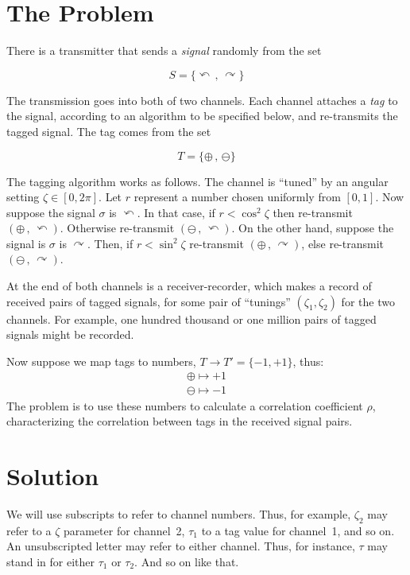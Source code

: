 \documentclass[9pt,technote]{IEEEtran}
\begin{document}
\section{The Problem}

There is a transmitter that sends a {\em{signal}} randomly from the
set

\begin{equation}
  S=\{\curvearrowleft\,,\,\curvearrowright\}
\end{equation}

The transmission goes into both of two channels. Each channel attaches
a {\em{tag}} to the signal, according to an algorithm to be specified
below, and re-transmits the tagged signal. The tag comes from the set

\begin{equation}
  T=\{\oplus\,,\,\ominus\}
\end{equation}

The tagging algorithm works as follows. The channel is ``tuned'' by an
angular setting $\zeta\in[0,2\pi]$. Let $r$ represent a number chosen
uniformly from $[0,1]$. Now suppose the signal $\sigma$ is
$\curvearrowleft$. In that case, if $r < \cos^2 \zeta$ then
re-transmit $(\oplus\,,\,\curvearrowleft)$. Otherwise re-transmit
$(\ominus\,,\,\curvearrowleft)$. On the other hand, suppose the signal
is $\sigma$ is $\curvearrowright$. Then, if $r < \sin^2 \zeta$
re-transmit $(\oplus\,,\,\curvearrowright)$, else re-transmit
$(\ominus\,,\,\curvearrowright)$.

At the end of both channels is a receiver-recorder, which makes a
record of received pairs of tagged signals, for some pair of
``tunings'' $(\zeta_1,\zeta_2)$ for the two channels. For example, one
hundred thousand or one million pairs of tagged signals might be
recorded.

Now suppose we map tags to numbers, $T\to T'=\{-1,+1\}$, thus:
\begin{align}
  \oplus \mapsto +1 \\
  \ominus \mapsto -1
\end{align}
The problem is to use these numbers to calculate a correlation
coefficient $\rho$, characterizing the correlation between tags in the
received signal pairs.

\section{Solution}

We will use subscripts to refer to channel numbers. Thus, for example,
$\zeta_2$ may refer to a $\zeta$ parameter for channel~2, $\tau_1$ to
a tag value for channel~1, and so on. An unsubscripted letter may
refer to either channel. Thus, for instance, $\tau$ may stand in for
either $\tau_1$ or $\tau_2$. And so on like that.
\end{document}
